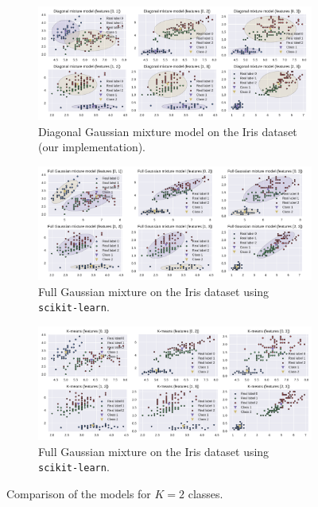 \documentclass[11pt]{article}
\begin{document}
\begin{figure}
	\centering
	\begin{subfigure}[t]{.95\linewidth}
		\includegraphics[width=\linewidth]{images/diag_em_K2.pdf}
		\caption{Diagonal Gaussian mixture model on the Iris dataset (our implementation).}
	\end{subfigure}
	\begin{subfigure}[t]{.95\linewidth}
		\includegraphics[width=\linewidth]{images/full_em_K2.pdf}
		\caption{Full Gaussian mixture on the Iris dataset using \texttt{scikit-learn}.}
	\end{subfigure}
	\begin{subfigure}[t]{.95\linewidth}
		\includegraphics[width=\linewidth]{images/kmeans_K2.pdf}
		\caption{Full Gaussian mixture on the Iris dataset using \texttt{scikit-learn}.}
	\end{subfigure}
	\caption{Comparison of the models for $K=2$ classes.}\label{fig:EMdiagfullComparisonK2}
\end{figure}
\end{document}
